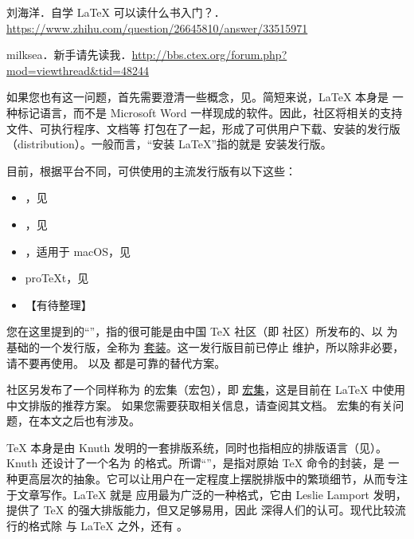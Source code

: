 \begin{reference}
  \item 刘海洋．自学 \LaTeX{} 可以读什么书入门？．
    \url{https://www.zhihu.com/question/26645810/answer/33515971}
  \item milksea．新手请先读我．\url{http://bbs.ctex.org/forum.php?mod=viewthread&tid=48244}
\end{reference}



如果您也有这一问题，首先需要澄清一些概念，见。简短来说，\LaTeX{} 本身是
一种标记语言，而不是 Microsoft Word 一样现成的软件。因此，社区将相关的支持文件、可执行程序、文档等
打包在了一起，形成了可供用户下载、安装的发行版（distribution）。一般而言，“安装 \LaTeX{}”指的就是
安装发行版。

目前，根据平台不同，可供使用的主流发行版有以下这些：

\begin{itemize}
  \item \TeXLive{}，见
  \item \MiKTeX{}，见
  \item \MacTeX{}，适用于 macOS，见
  \item pro\TeX{}t，见
  \item 【有待整理】
\end{itemize}



您在这里提到的“\CTeX{}”，指的很可能是由中国 \TeX{} 社区（即 \CTeX{} 社区）所发布的、以 \MiKTeX{}
为基础的一个发行版，全称为 \href{http://www.ctex.org/CTeX}{\CTeX{} 套装}。这一发行版目前已停止
维护，所以除非必要，请不要再使用。\TeXLive{} 以及 \MiKTeX{} 都是可靠的替代方案。

\CTeX{} 社区另发布了一个同样称为 \CTeX{} 的宏集（宏包），即
\href{https://www.ctan.org/pkg/ctex}{\CTeX{} 宏集}，这是目前在 \LaTeX{} 中使用中文排版的推荐方案。
如果您需要获取相关信息，请查阅其文档。\CTeX{} 宏集的有关问题，在本文之后也有涉及。



\TeX{} 本身是由 Knuth 发明的一套排版系统，同时也指相应的排版语言（见）。
Knuth 还设计了一个名为 \PlainTeX{} 的格式。所谓“”，是指对原始 \TeX{} 命令的封装，是
一种更高层次的抽象。它可以让用户在一定程度上摆脱排版中的繁琐细节，从而专注于文章写作。\LaTeX{} 就是
应用最为广泛的一种格式，它由 Leslie Lamport 发明，提供了 \TeX{} 的强大排版能力，但又足够易用，因此
深得人们的认可。现代比较流行的格式除 \PlainTeX{} 与 \LaTeX{} 之外，还有 \ConTeXt{}。

